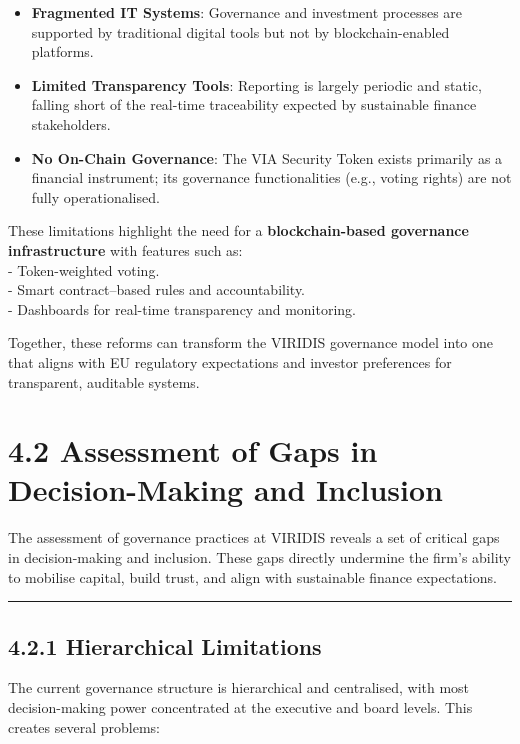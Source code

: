 \documentclass[
  english,
  12pt,
  oneside,
  open=any]{scrbook}
\providecommand{\tightlist}{%
  \setlength{\itemsep}{0pt}\setlength{\parskip}{0pt}}\usepackage{longtable,booktabs,array}
\begin{document}
\begin{itemize}
\tightlist
\item
  \textbf{Fragmented IT Systems}: Governance and investment processes
  are supported by traditional digital tools but not by
  blockchain-enabled platforms.\\
\item
  \textbf{Limited Transparency Tools}: Reporting is largely periodic and
  static, falling short of the real-time traceability expected by
  sustainable finance stakeholders.\\
\item
  \textbf{No On-Chain Governance}: The VIA Security Token exists
  primarily as a financial instrument; its governance functionalities
  (e.g., voting rights) are not fully operationalised.
\end{itemize}

These limitations highlight the need for a \textbf{blockchain-based
governance infrastructure} with features such as:\\
- Token-weighted voting.\\
- Smart contract--based rules and accountability.\\
- Dashboards for real-time transparency and monitoring.

Together, these reforms can transform the VIRIDIS governance model into
one that aligns with EU regulatory expectations and investor preferences
for transparent, auditable systems.

\section{4.2 Assessment of Gaps in Decision-Making and
Inclusion}\label{sec-gaps}

The assessment of governance practices at VIRIDIS reveals a set of
critical gaps in decision-making and inclusion. These gaps directly
undermine the firm's ability to mobilise capital, build trust, and align
with sustainable finance expectations.

\begin{center}\rule{0.5\linewidth}{0.5pt}\end{center}

\subsection{4.2.1 Hierarchical Limitations}\label{sec-hier}

The current governance structure is hierarchical and centralised, with
most decision-making power concentrated at the executive and board
levels. This creates several problems:
\end{document}
